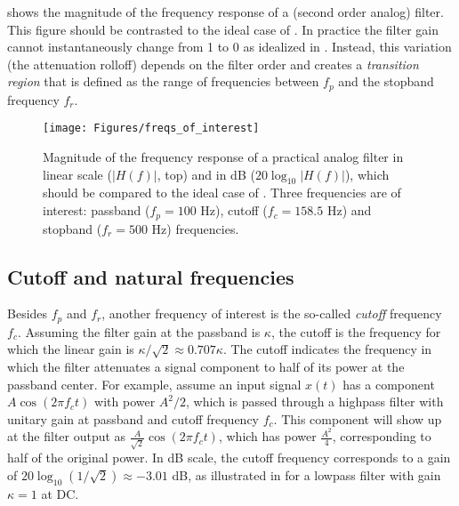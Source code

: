 shows the magnitude of the frequency response of a (second order analog) filter. This figure should be contrasted to the ideal case of . In practice the filter gain cannot instantaneously change from 1 to 0 as idealized in . Instead, this variation (the attenuation rolloff) depends on the filter order and creates a \emph{transition region} that is defined as the range of frequencies between $f_p$ and the stopband frequency $f_r$.

\begin{figure}
\centering
\texttt{[image: Figures/freqs\_of\_interest]}
\caption[{Magnitude of the frequency response of a practical analog filter in linear scale ($|H(f)|$, top) and in dB ($20 log_{10}|H(f)|$), which should be compared to the ideal case of .}]{Magnitude of the frequency response of a practical analog filter in linear scale ($|H(f)|$, top) and in dB ($20\log_{10}|H(f)|$), which should be compared to the ideal case of . Three frequencies are of interest: passband ($f_p=100$ Hz), cutoff ($f_c=158.5$ Hz) and stopband ($f_r = 500$ Hz) frequencies. \label{fig:freqs_of_interest}}
\end{figure}

\subsection{Cutoff and natural frequencies}

Besides $f_p$ and $f_r$, another frequency of interest is the so-called \emph{cutoff} frequency $f_c$. Assuming the filter gain at the passband is $\kappa$, the cutoff is the frequency for which the linear gain is $\kappa/\sqrt{2} \approx 0.707 \kappa$. %
The cutoff indicates the frequency in which the filter attenuates a signal component to half of its power at the passband center. For example, assume an input signal $x(t)$ has a component $A \cos(2 \pi f_c t)$ with power $A^2/2$, which is passed through a highpass filter with unitary gain at passband and cutoff frequency $f_c$. This component will show up at the filter output as $\frac{A}{\sqrt{2}} \cos(2 \pi f_c t)$, which has power $\frac{A^2}{4}$, corresponding to half of the original power. In dB scale, the cutoff frequency corresponds to a gain of $20 \log_{10}(1/\sqrt{2}) \approx -3.01$ dB, as illustrated in  for a lowpass filter with gain $\kappa=1$ at DC.

